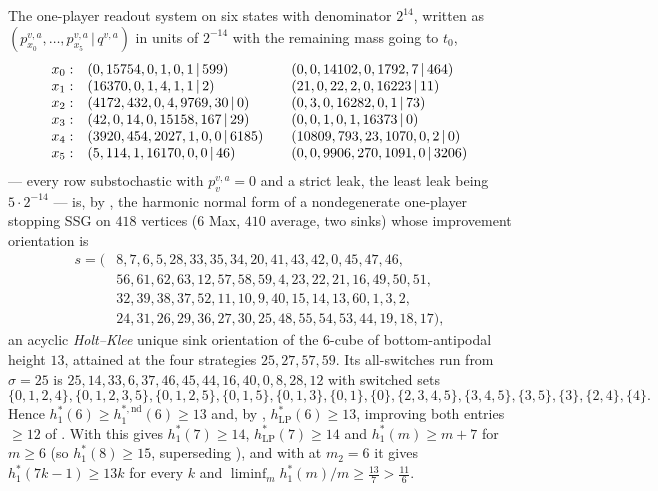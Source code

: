 \begin{proposition}\label{mw:h13}
The one-player readout system on six states with denominator $2^{14}$,
written as $(p^{v,a}_{x_0},\dots,p^{v,a}_{x_5}\,|\,q^{v,a})$ in units of
$2^{-14}$ with the remaining mass going to $t_0$,
\[
 \begin{array}{r@{\quad}l@{\qquad}l}
  x_0: & (0,15754,0,1,0,1\,|\,599) & (0,0,14102,0,1792,7\,|\,464)\\
  x_1: & (16370,0,1,4,1,1\,|\,2) & (21,0,22,2,0,16223\,|\,11)\\
  x_2: & (4172,432,0,4,9769,30\,|\,0) & (0,3,0,16282,0,1\,|\,73)\\
  x_3: & (42,0,14,0,15158,167\,|\,29) & (0,0,1,0,1,16373\,|\,0)\\
  x_4: & (3920,454,2027,1,0,0\,|\,6185) & (10809,793,23,1070,0,2\,|\,0)\\
  x_5: & (5,114,1,16170,0,0\,|\,46) & (0,0,9906,270,1091,0\,|\,3206)
 \end{array}
\]
--- every row substochastic with $p^{v,a}_v=0$ and a strict leak, the least
leak being $5\cdot2^{-14}$ --- is, by , the harmonic
normal form of a nondegenerate one-player stopping SSG on $418$ vertices
($6$ Max, $410$ average, two sinks) whose improvement orientation is
\[
 \begin{aligned}
 s=(&8,7,6,5,28,33,35,34,20,41,43,42,0,45,47,46,\\
    &56,61,62,63,12,57,58,59,4,23,22,21,16,49,50,51,\\
    &32,39,38,37,52,11,10,9,40,15,14,13,60,1,3,2,\\
    &24,31,26,29,36,27,30,25,48,55,54,53,44,19,18,17),
 \end{aligned}
\]
an acyclic \emph{Holt--Klee} unique sink orientation of the $6$-cube of
bottom-antipodal height $13$, attained at the four strategies $25,27,57,59$.
Its all-switches run from $\sigma=25$ is
$25,14,33,6,37,46,45,44,16,40,0,8,28,12$ with switched sets
\[
 \{0,1,2,4\},\{0,1,2,3,5\},\{0,1,2,5\},\{0,1,5\},\{0,1,3\},\{0,1\},\{0\},
 \{2,3,4,5\},\{3,4,5\},\{3,5\},\{3\},\{2,4\},\{4\}.
\]
Hence $h^{\ast}_{1}(6)\ge h^{\ast,\mathrm{nd}}_{1}(6)\ge13$ and, by
, $h^{\ast}_{\mathrm{LP}}(6)\ge13$, improving both
entries $\ge12$ of . With
 this gives $h^{\ast}_{1}(7)\ge14$,
$h^{\ast}_{\mathrm{LP}}(7)\ge14$ and $h^{\ast}_{1}(m)\ge m+7$ for $m\ge6$
(so $h^{\ast}_{1}(8)\ge15$, superseding ), and
with  at $m_2=6$ it gives $h^{\ast}_{1}(7k-1)\ge13k$
for every $k$ and
$\liminf_m h^{\ast}_{1}(m)/m\ge\tfrac{13}{7}>\tfrac{11}{6}$.
\end{proposition}

